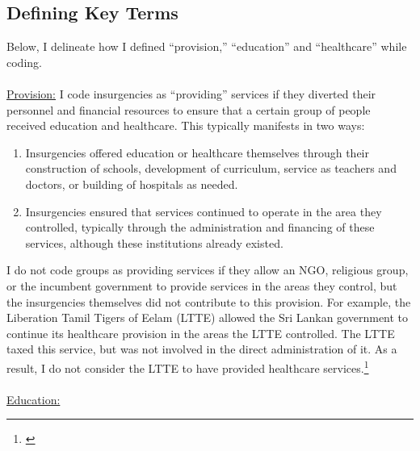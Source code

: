 \documentclass[12pt, letterpaper]{article}
\begin{document}
\subsection*{Defining Key Terms}
Below, I delineate how I defined ``provision,'' ``education'' and ``healthcare'' while coding.
\\
\\
\noindent \underline{Provision:}
I code insurgencies as ``providing'' services if they diverted their personnel and financial resources to ensure that a certain group of people received education and healthcare. This typically manifests in two ways:
\begin{enumerate}
\singlespacing
\item Insurgencies offered education or healthcare themselves through their construction of schools, development of curriculum, service as teachers and doctors, or building of hospitals as needed.
\item Insurgencies ensured that services continued to operate in the area they controlled, typically through the administration and financing of these services, although these institutions already existed.
\end{enumerate}
I do not code groups as providing services if they allow an NGO, religious group, or the incumbent government to provide services in the areas they control, but the insurgencies themselves did not contribute to this provision. For example, the Liberation Tamil Tigers of Eelam (LTTE) allowed the Sri Lankan government to continue its healthcare provision in the areas the LTTE controlled. The LTTE taxed this service, but was not involved in the direct administration of it. As a result, I do not consider the LTTE to have provided healthcare services.\footnote{\citealt[118-9]{mampilly2011rebel}}
\\
\\
\noindent \underline{Education:}
\end{document}
